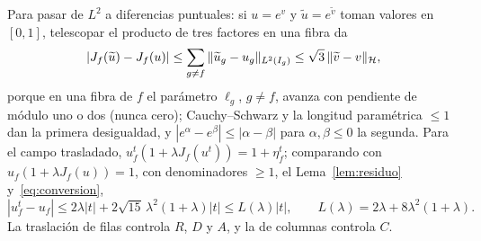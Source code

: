 Para pasar de $L^2$ a diferencias puntuales: si $u=e^v$ y $\widetilde u=e^{\widetilde v}$ toman valores en
$[0,1]$, telescopar el producto de tres factores en una fibra da
\begin{equation}\label{eq:conversion}
 |J_f(\widetilde u)-J_f(u)|\le\sum_{g\ne f}\|\widetilde u_g-u_g\|_{L^2(I_g)}\le\sqrt3\,\|\widetilde v-v\|_{\mathcal{H}} ,
\end{equation}
porque en una fibra de $f$ el parámetro $\ell_g$, $g\ne f$, avanza con pendiente de módulo uno o dos
(nunca cero); Cauchy--Schwarz y la longitud paramétrica $\le1$ dan la primera desigualdad, y
$|e^\alpha-e^\beta|\le|\alpha-\beta|$ para $\alpha,\beta\le0$ la segunda. Para el campo trasladado,
$u^t_f(1+\lambda J_f(u^t))=1+\eta^t_f$; comparando con $u_f(1+\lambda J_f(u))=1$, con denominadores
$\ge1$, el Lema~\ref{lem:residuo} y~\eqref{eq:conversion},
\begin{equation}\label{eq:traslacion}
 |u^t_f-u_f|\le2\lambda|t|+2\sqrt{15}\,\lambda^2(1+\lambda)|t|\le L(\lambda)|t|,\qquad
 L(\lambda)=2\lambda+8\lambda^2(1+\lambda).
\end{equation}
La traslación de filas controla $R$, $D$ y $A$, y la de columnas controla $C$.

